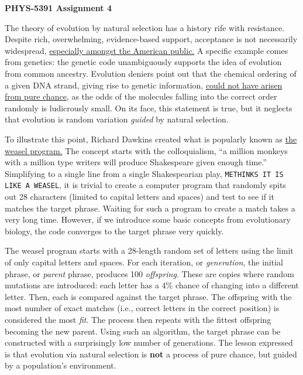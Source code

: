 \documentclass[12pt, letterpaper]{article}
\begin{document}
\begin{center}
  {\LARGE \textbf{PHYS-5391 Assignment 4}}\\
\end{center}


The theory of evolution by natural selection has a history rife with resistance.
Despite rich, overwhelming, evidence-based support, acceptance
is not necessarily widespread, 
\href{http://en.wikipedia.org/wiki/Level_of_support_for_evolution#United_States}
{especially amongst the American public.}  A specific example comes from
genetics: the genetic code unambiguously supports the idea of evolution from
common ancestry.  Evolution deniers point out that the chemical
ordering of a given DNA strand, giving rise to genetic information, 
\href{http://en.wikipedia.org/wiki/Hoyle%27s_fallacy}{could not have
arisen from pure chance}, as the odds of the molecules falling into the correct
order randomly is ludicrously small.  On its face, this statement is true, but
it neglects that evolution is random variation \emph{guided} by natural
selection.

To illustrate this point, Richard Dawkins created what is popularly known
as \href{http://en.wikipedia.org/wiki/Weasel_program}{the weasel program.}
The concept starts with the colloquialism, ``a million monkeys with a million
type writers will produce Shakespeare given enough time.''  Simplifying
to a single line from a single Shakespearian play, {\tt METHINKS IT IS LIKE
A WEASEL}, it is trivial to create a computer program that randomly spits out
28 characters (limited to capital letters and spaces) and test to see if it
matches the target phrase.  Waiting for such a program to create a match takes
a very long time.  However, if we introduce some basic concepts from 
evolutionary biology, the code converges to the target phrase very quickly.

The weasel program starts with a 28-length random set of letters using the 
limit of only capital letters and spaces.  
For each iteration, or \emph{generation}, the initial phrase, or \emph{parent}
phrase, produces 100 \emph{offspring}.  These are copies where random mutations
are introduced: each letter has a 4\% chance of changing into a different
letter.  Then, each is compared against the target phrase.  The offspring 
with the most number of exact matches (i.e., correct letters in the correct
position) is considered the most \emph{fit}.  The process then repeats with
the fittest offspring becoming the new parent.  Using such an algorithm, the
target phrase can be constructed with a surprisingly low number of generations.
The lesson expressed is that evolution via natural selection is \textbf{not}
a process of pure chance, but guided by a population's environment.
\end{document}
